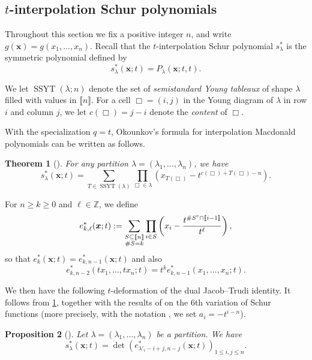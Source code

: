 \documentclass[12pt]{amsart}
\newtheorem{thm}{Theorem}[section]
\newtheorem{prop}[thm]{Proposition}
\theoremstyle{definition}
\newcommand{\bfx}{\boldsymbol{x}}
\DeclareMathOperator{\SSYT}{SSYT}
\newcommand{\ZZ}{\mathbb Z}
\def\LW#1{(\textcolor{teal}{LW:#1})}
\begin{document}
\begin{appendices}
\section{\texorpdfstring{$t$}{t}-interpolation Schur polynomials}\label{app:t_int_Schur}
Throughout this section we fix a positive integer $n$,
and write 
$g(\bfx)=g(x_1,\dots,x_n)$.
Recall that the $t$-interpolation Schur polynomial $s_\lambda^*$ is the symmetric polynomial defined by
    $$s^*_\lambda(\bfx;t)=P_\lambda(\bfx;t,t).$$


We let $\SSYT(\lambda;n)$ denote the set of \emph{semistandard Young tableaux} of shape $\lambda$ filled with values in $\llbracket n\rrbracket$. For a cell $\Box=(i,j)$ in the Young diagram of $\lambda$ in  row $i$ and column $j$, we let $c(\Box)=j-i$ denote the \emph{content} of $\Box$.

With the specialization $q=t$, Okounkov's formula for interpolation Macdonald polynomials \cite[Equation (1.4)]{Okounkov1998} can be written as follows.

\begin{thm}[\cite{Okounkov1998}]\label{thm:Okounkov}
For any partition $\lambda=(\lambda_1,\dots,\lambda_n)$, we have
$$s^*_\lambda(\bfx;t)=\sum_{T\in \SSYT(\lambda)}\prod_{\Box\in \lambda}(x_{T(\Box)}-t^{c(\Box)+T(\Box)-n}).$$
\end{thm}

For $n\geq k\geq 0$ and $\ell\in \ZZ$, we define
$$e_{k,\ell}^*(\bfx;t):=\sum_{\begin{subarray}{c}S\subseteq \llbracket n \rrbracket\\  \#S=k\end{subarray}}\prod_{i\in S}\left(x_i-\frac{t^{\#S^c\cap \llbracket i-1\rrbracket}}{t^{\ell}}\right),$$
so that $e^*_k(\bfx;t)=e^*_{k,n-1}(\bfx;t)$
and also
\begin{equation}\label{eq:identity}
e^*_{k,n-2}(tx_1,\dots,tx_n;t) = t^k e^*_{k,n-1}(x_1,\dots,x_n;t).    
\end{equation}


We then have the following $t$-deformation of the dual Jacob–Trudi identity. It follows from \cref{thm:Okounkov}, together with the results of \cite{Macdonald1992} on the 6th variation of Schur functions (more precisely, with the notation \cite[Section6]{Macdonald1992}, we set $a_i=-t^{i-n}$).

\begin{prop}[\cite{Macdonald1992}]
    Let $\lambda=(\lambda_1,\dots,\lambda_{n})$ be a partition. We have
    \begin{equation}\label{eq:int_dual_JT}
      s^*_\lambda(\bfx;t)=\det\left(e^*_{\lambda'_i-i+j, n-j}(\bfx;t)\right)_{1\leq i,j\leq n}.  
    \end{equation}
\end{prop}


\end{appendices}
\end{document}
